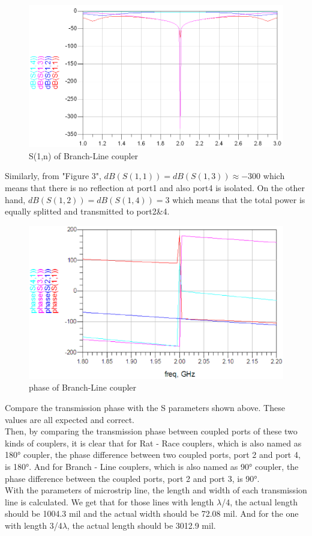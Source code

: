 \documentclass[11pt,a4paper]{report}
\begin{document}
\begin{figure}
\centering
\includegraphics[width=\textwidth]{2.5.png}
\caption{S(1,n) of Branch-Line coupler}
\end{figure}

Similarly, from "Figure 3", \(dB(S(1,1)) = dB(S(1,3)) \approx -300\) which means that there is no reflection at port1 and also port4 is isolated. On the other hand, \(dB(S(1,2)) = dB(S(1,4)) = 3\) which means that the total power is equally splitted and transmitted to port2\&4. \\

\begin{figure}
\centering
\includegraphics[width=\textwidth]{branch-line-phase.eps}
\caption{phase of Branch-Line coupler}
\end{figure}

Compare the transmission phase with the S parameters shown above. These values are all expected and correct. \\

Then, by comparing the transmission phase between coupled ports of these two kinds of couplers, it is clear that for Rat - Race couplers, which is also named as  180° coupler, the phase difference between two coupled ports, port 2 and port 4, is 180°. And for Branch - Line couplers, which is also named as  90° coupler, the phase difference between the coupled ports, port 2 and port 3, is 90°. \\

With the parameters of microstrip line, the length and width of each transmission line is calculated. We get that for those lines with length \(\lambda\)/4, the actual length should be 1004.3 mil and the actual width should be 72.08 mil. And for the one with length 3/4\(\lambda\), the actual length should be 3012.9 mil.
\end{document}
